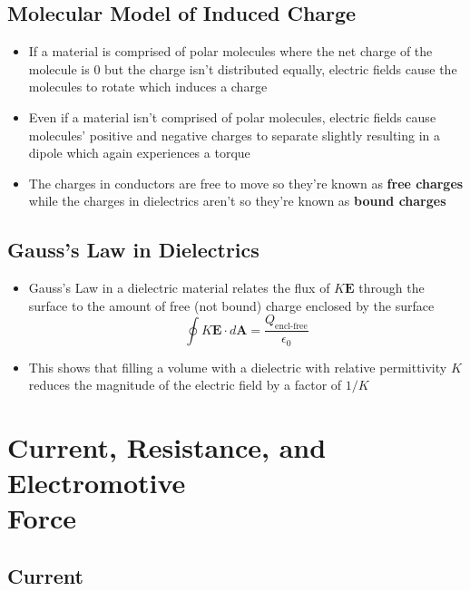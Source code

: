 \documentclass{article}
\begin{document}
\subsection{Molecular Model of Induced Charge}

\begin{itemize}
  \item If a material is comprised of polar molecules where the net charge of the molecule is $0$ but the charge isn't distributed equally, electric fields cause the molecules to rotate which induces a charge

  \item Even if a material isn't comprised of polar molecules, electric fields cause molecules' positive and negative charges to separate slightly resulting in a dipole which again experiences a torque

  \item The charges in conductors are free to move so they're known as \textbf{free charges} while the charges in dielectrics aren't so they're known as \textbf{bound charges}
\end{itemize}

\subsection{Gauss's Law in Dielectrics}

\begin{itemize}
  \item Gauss's Law in a dielectric material relates the flux of $K \mathbf{E}$ through the surface to the amount of free (not bound) charge enclosed by the surface \[\oint K \mathbf{E} \cdot d\mathbf{A} = \frac{Q_\textrm{encl-free}}{\epsilon_0}\]

  \item This shows that filling a volume with a dielectric with relative permittivity $K$ reduces the magnitude of the electric field by a factor of $1 / K$
\end{itemize}

\section{Current, Resistance, and Electromotive \\ Force}

\subsection{Current}
\end{document}
